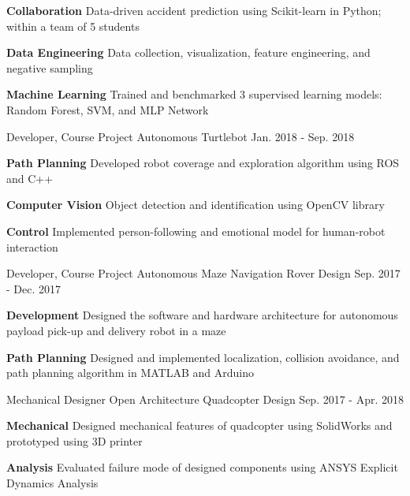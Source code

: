 \begin{cventries}
{\begin{cvitems}
			\item {\textbf{Collaboration} Data-driven accident prediction using Scikit-learn in Python; within a team of 5 students}
			\item {\textbf{Data Engineering} Data collection, visualization, feature engineering, and negative sampling}
			\item {\textbf{Machine Learning} Trained and benchmarked 3 supervised learning models: Random Forest, SVM, and MLP Network}
		\end{cvitems}
	}
	\cventry
	{Developer, Course Project}
	{Autonomous Turtlebot}
	{Jan. 2018 - Sep. 2018}
	{}
	{
		\begin{cvitems}
			\item {\textbf{Path Planning} Developed robot coverage and exploration algorithm using ROS and C++}
			\item {\textbf{Computer Vision} Object detection and identification using OpenCV library}
			\item {\textbf{Control} Implemented person-following and emotional model for human-robot interaction}
		\end{cvitems}
	}
	\cventry
	{Developer, Course Project}
	{Autonomous Maze Navigation Rover Design}
	{Sep. 2017 - Dec. 2017}
	{}
	{
		\begin{cvitems}
			\item { \textbf{Development} Designed the software and hardware architecture for autonomous payload pick-up and delivery robot in a maze}
			\item { \textbf{Path Planning} Designed and implemented localization, collision avoidance, and path planning algorithm in MATLAB and Arduino}
		\end{cvitems}
	}
	\cventry
	{Mechanical Designer}
	{Open Architecture Quadcopter Design}
	{Sep. 2017 - Apr. 2018}
	{}
	{
		\begin{cvitems}
			\item {\textbf{Mechanical} Designed mechanical features of quadcopter using SolidWorks and prototyped using 3D printer}
			\item {\textbf{Analysis} Evaluated failure mode of designed components using ANSYS Explicit Dynamics Analysis}
		\end{cvitems}
	}
\end{cventries}
